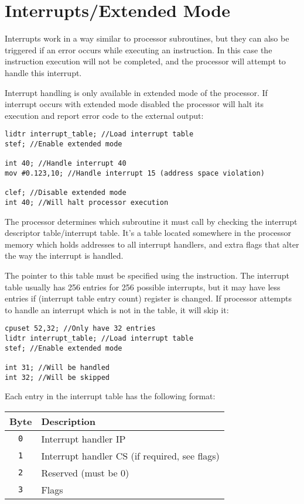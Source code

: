 
\section{Interrupts/Extended Mode} \label{advancedinterrupts}
Interrupts work in a way similar to processor subroutines, but they can also be triggered if an error occurs while executing an instruction. In this case the instruction execution will not be completed, and the processor will attempt to handle this interrupt.

Interrupt handling is only available in extended mode of the processor. If interrupt occurs with extended mode disabled the processor will halt its execution and report error code to the external output:
\begin{verbatim}
lidtr interrupt_table; //Load interrupt table
stef; //Enable extended mode

int 40; //Handle interrupt 40
mov #0.123,10; //Handle interrupt 15 (address space violation)

clef; //Disable extended mode
int 40; //Will halt processor execution
\end{verbatim}

The processor determines which subroutine it must call by checking the interrupt descriptor table/interrupt table. It's a table located somewhere in the processor memory which holds addresses to all interrupt handlers, and extra flags that alter the way the interrupt is handled.

The pointer to this table must be specified using the  instruction. The interrupt table usually has 256 entries for 256 possible interrupts, but it may have less entries if  (interrupt table entry count) register is changed. If processor attempts to handle an interrupt which is not in the table, it will skip it:
\begin{verbatim}
cpuset 52,32; //Only have 32 entries
lidtr interrupt_table; //Load interrupt table
stef; //Enable extended mode

int 31; //Will be handled
int 32; //Will be skipped
\end{verbatim}

Each entry in the interrupt table has the following format:

\singlespacing
\begin{longtable}{|c|p{4.0in}|} \hline
Byte & Description \\ \hline
\texttt{0} & Interrupt handler IP \\ \hline
\texttt{1} & Interrupt handler CS (if required, see flags) \\ \hline
\texttt{2} & Reserved (must be 0) \\ \hline
\texttt{3} & Flags \\ \hline
\end{longtable}
\onehalfspacing

